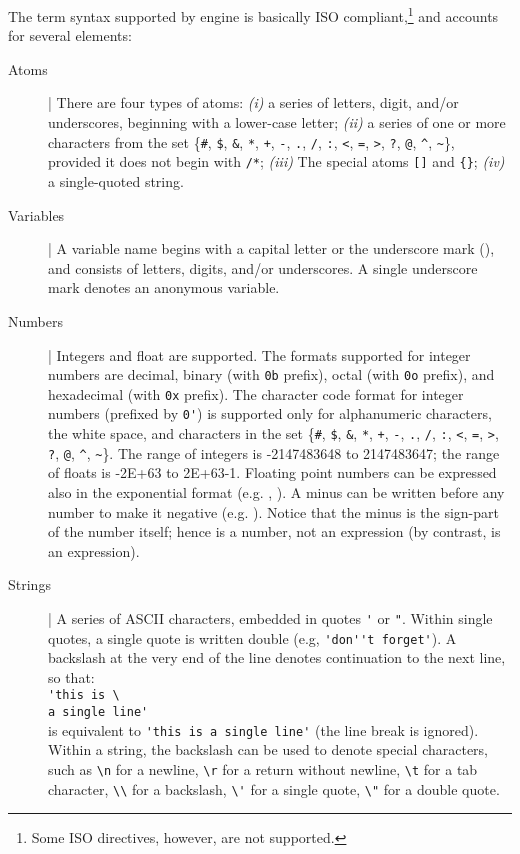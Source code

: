 The term syntax supported by \tuprolog{} engine is basically ISO compliant,\footnote{Some ISO directives, however, are not supported.} and accounts for several elements:
%
\begin{description}

\item[Atoms] |
There are four types of atoms:
\emph{(i)} a series of letters, digit, and/or underscores, beginning with a lower-case letter; \emph{(ii)} a series of one or more characters from the set \{\texttt{\#}, \texttt{\$}, \texttt{\&}, \texttt{*}, \texttt{+}, \texttt{-}, \texttt{.}, \texttt{/}, \texttt{:}, \texttt{<}, \texttt{=}, \texttt{>}, \texttt{?}, \texttt{@}, \texttt{\textasciicircum}, \texttt{\~}\}, provided it does not begin with \texttt{/*};
\emph{(iii)} The special atoms \texttt{[]} and \texttt{\{\}};
\emph{(iv)} a single-quoted string.

\item[Variables] |
A variable name begins with a capital
letter or the underscore mark (\bt{\_}), and consists of letters,
digits, and/or underscores.
%
A single underscore mark denotes an anonymous variable.

\item[Numbers] |
Integers and float are supported.
%
The formats supported for integer numbers are decimal, binary (with \verb|0b|
prefix), octal (with \verb|0o| prefix), and hexadecimal (with \verb|0x|
prefix). The character code format for integer numbers (prefixed by \verb|0'|) is supported only for alphanumeric characters, the white space, and characters in the set \{\texttt{\#}, \texttt{\$}, \texttt{\&}, \texttt{*}, \texttt{+}, \texttt{-}, \texttt{.}, \texttt{/}, \texttt{:}, \texttt{<}, \texttt{=}, \texttt{>}, \texttt{?}, \texttt{@}, \texttt{\textasciicircum}, \texttt{\~}\}.
%
The range of integers is -2147483648 to 2147483647; the range of floats is
-2E+63 to 2E+63-1.
%
Floating point numbers can be expressed also in the exponential format (e.g. , ).
%
A minus can be written before any number to make it negative (e.g. ).
%
Notice that the minus is the sign-part of the number itself; hence  is a number, not an expression (by contrast,  is an expression).

\item[Strings] |
A series of ASCII characters, embedded in quotes \verb|'| or \verb|"|.
%
Within single quotes, a single quote is written double (e.g, \verb|'don''t forget'|).
%
A backslash at the very end of the line denotes continuation to the next line, so that: \\
\verb|'this is \ |\\
\verb|a single line'|\\
is equivalent to \verb|'this is a single line'| (the line break is ignored).
%
Within a string, the backslash can be used to denote special characters, such as \verb|\n| for a newline,
\verb|\r| for a return without newline,
\verb|\t| for a tab character,
\verb|\\| for a backslash,
\verb|\'| for a single quote,
\verb|\"| for a double quote.


\end{description}
